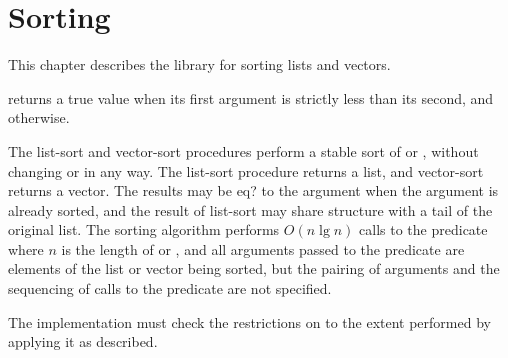 \chapter{Sorting}
\label{sortingchapter}

This chapter describes the  library for
sorting lists and vectors.

\begin{entry}{%
}

   returns a true value when its first argument
is strictly less than its second, and \schfalse{} otherwise.

The {\cf list-sort} and {\cf vector-sort} procedures perform a stable
sort of  or , without changing  or
 in any way.  The {\cf list-sort} procedure returns a
list, and {\cf vector-sort} returns a vector.  The results may be {\cf
  eq?} to the argument when the argument is already sorted, and the
result of {\cf list-sort} may share structure with a tail of the
original list.  The sorting algorithm performs $O(n \lg n)$ calls to
the predicate where $n$ is the length of  or ,
and all arguments passed to the predicate are elements of the list or
vector being sorted, but the pairing of arguments and the sequencing
of calls to the predicate are not specified.

\implresp The implementation must check the restrictions
on  to the extent performed by applying it as described.
\end{entry}

